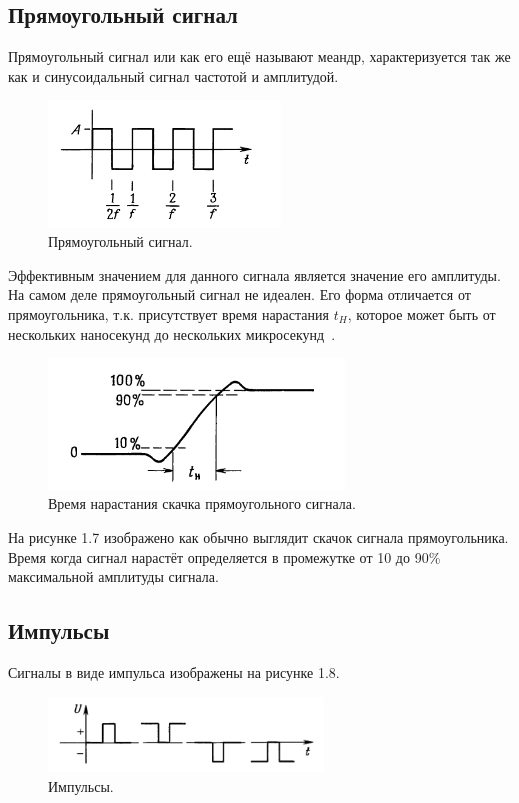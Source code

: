 \subsection{Прямоугольный сигнал}
	Прямоугольный сигнал или как его ещё называют меандр, характеризуется так же как и синусоидальный сигнал частотой и амплитудой.
	\begin{figure}[H]
    \centering
    \includegraphics[width=0.55\textwidth]{../image/s_p.png}
    \caption{Прямоугольный сигнал.}
	\end{figure}

	Эффективным значением для данного сигнала является значение его амплитуды. На самом деле прямоугольный сигнал не идеален. Его форма отличается от прямоугольника, т.к. присутствует время нарастания $t_{H}$, которое может быть от нескольких наносекунд до нескольких микросекунд~\cite{is1}.

	\begin{figure}[H]
    \centering
    \includegraphics[width=0.7\textwidth]{../image/s_p_t.png}
    \caption{Время нарастания скачка прямоугольного сигнала.}
	\end{figure}
	
	На рисунке 1.7 изображено как обычно выглядит скачок сигнала прямоугольника. Время когда сигнал нарастёт определяется в промежутке от 10 до 90\% максимальной амплитуды сигнала.

\subsection{Импульсы}
Сигналы в виде импульса изображены на рисунке 1.8.

	\begin{figure}[H]
    \centering
    \includegraphics[width=0.65\textwidth]{../image/s_i.png}
    \caption{Импульсы.}
	\end{figure}
	
